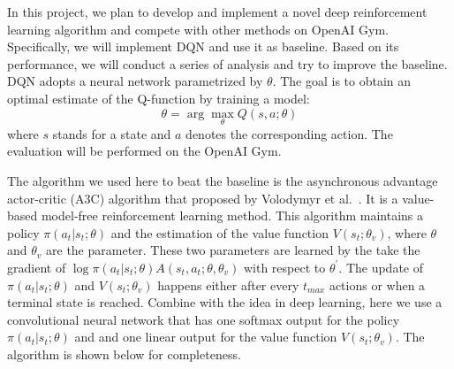 
In this project, we plan to develop and implement a novel deep reinforcement learning algorithm and compete with other methods on OpenAI Gym. Specifically, we will implement DQN and use it as baseline. Based on its performance, we will conduct a series of analysis and try to improve the baseline.
%
DQN adopts a neural network parametrized by $\theta$. The goal is to obtain an optimal estimate of the Q-function by training a model:
\begin{equation*}
\theta = \arg\max_\theta Q(s,a;\theta)
\end{equation*}
where $s$ stands for a state and $a$ denotes the corresponding action. 
The evaluation will be performed on the OpenAI Gym.

The algorithm we used here to beat the baseline is the asynchronous advantage actor-critic (A3C) algorithm that proposed by Volodymyr et al.~\cite{mnih2016asynchronous}. It is a value-based model-free reinforcement learning method. This algorithm maintains a policy $\pi (a_{t}|s_{t};\theta)$ and the estimation of the value function $V(s_{t};\theta_{v})$, where $\theta$ and $\theta_{v}$ are the parameter. These two parameters are learned by the take the gradient of $\log \pi (a_{t}|s_{t};\theta) A(s_{t},a_{t};\theta,\theta_{v})$ with respect to $\theta^{\prime}$. The update of $\pi (a_{t}|s_{t};\theta)$ and $V(s_{t};\theta_{v})$ happens either after every $t_{max}$ actions or when a terminal state is reached. Combine with the idea in deep learning, here we use a convolutional neural network that has one softmax output for the policy $\pi (a_{t}|s_{t};\theta)$ and and
one linear output for the value function $V(s_{t};\theta_{v})$. The algorithm is shown below for completeness.